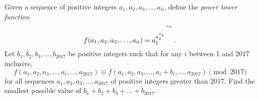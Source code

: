 Given a sequence of positive integers $a_1, a_2, a_3, \dots, a_{n}$, define the \emph{power tower function} \[f(a_1, a_2, a_3, \dots, a_{n})=a_1^{a_2^{a_3^{\mathstrut^{ .^{.^{.^{a_{n}}}}}}}}.\] Let $b_1, b_2, b_3, \dots, b_{2017}$ be positive integers such that for any $i$ between 1 and 2017 inclusive, \[f(a_1, a_2, a_3, \dots, a_i, \dots, a_{2017})\equiv f(a_1, a_2, a_3, \dots, a_i+b_i, \dots, a_{2017}) \pmod{2017}\] for all sequences $a_1, a_2, a_3, \dots, a_{2017}$ of positive integers greater than 2017. Find the smallest possible value of $b_1+b_2+b_3+\dots+b_{2017}$.
